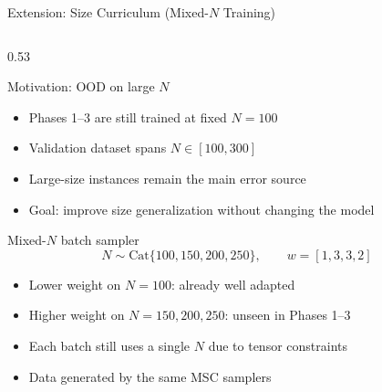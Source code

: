 \documentclass[aspectratio=169,11pt]{beamer}
\newcommand{\tightitems}{%
  \setlength{\itemsep}{1.5pt}%
  \setlength{\parsep}{0pt}%
  \setlength{\topsep}{2pt}%
}
\begin{document}
\begin{frame}[t]{Extension: Size Curriculum (Mixed-$N$ Training)}
  \begingroup
  \fontsize{7.2pt}{8.3pt}\selectfont
  \vspace{-0.12cm}

  \begin{columns}[T,onlytextwidth]
    \begin{column}{0.53\textwidth}
      \begin{block}{Motivation: OOD on large $N$}
        \begin{itemize}\tightitems
          \item Phases 1--3 are still trained at fixed $N=100$
          \item Validation dataset spans $N \in [100,300]$
          \item Large-size instances remain the main error source
          \item Goal: improve size generalization without changing the model
        \end{itemize}
      \end{block}

      \vspace{-0.04cm}
      \begin{block}{Mixed-$N$ batch sampler}
        \vspace{-0.14cm}
        \[
          N \sim \mathrm{Cat}\{100,150,200,250\},
          \qquad
          w=[1,3,3,2]
        \]
        \vspace{-0.30cm}
        \begin{itemize}\tightitems
          \item Lower weight on $N=100$: already well adapted
          \item Higher weight on $N=150,200,250$: unseen in Phases 1--3
          \item Each batch still uses a single $N$ due to tensor constraints
          \item Data generated by the same MSC samplers
        \end{itemize}
      \end{block}
    \end{column}

    \hfill


\end{columns}
\end{frame}
\end{document}
